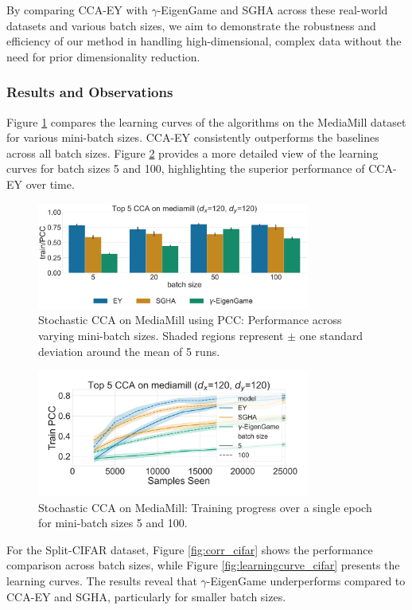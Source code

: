 By comparing CCA-EY with $\gamma$-EigenGame and SGHA across these real-world datasets and various batch sizes, we aim to demonstrate the robustness and efficiency of our method in handling high-dimensional, complex data without the need for prior dimensionality reduction.

\subsubsection{Results and Observations}
Figure \ref{fig:corr_mediamill} compares the learning curves of the algorithms on the MediaMill dataset for various mini-batch sizes. CCA-EY consistently outperforms the baselines across all batch sizes. Figure \ref{fig:learningcurve_mediamill} provides a more detailed view of the learning curves for batch sizes 5 and 100, highlighting the superior performance of CCA-EY over time.
\begin{figure}
\centering
\includegraphics[width=0.8\textwidth]{figures/CCA/mediamill_models_different_batch_sizes}
\caption{Stochastic CCA on MediaMill using PCC: Performance across varying mini-batch sizes. Shaded regions represent $\pm$ one standard deviation around the mean of 5 runs.}
\label{fig:corr_mediamill}
\end{figure}
\begin{figure}
\centering
\includegraphics[width=0.8\textwidth]{figures/CCA/mediamill_allbatchsizes_pcc}
\caption{Stochastic CCA on MediaMill: Training progress over a single epoch for mini-batch sizes 5 and 100.}
\label{fig:learningcurve_mediamill}
\end{figure}
For the Split-CIFAR dataset, Figure \ref{fig:corr_cifar} shows the performance comparison across batch sizes, while Figure \ref{fig:learningcurve_cifar} presents the learning curves. The results reveal that $\gamma$-EigenGame underperforms compared to CCA-EY and SGHA, particularly for smaller batch sizes.
